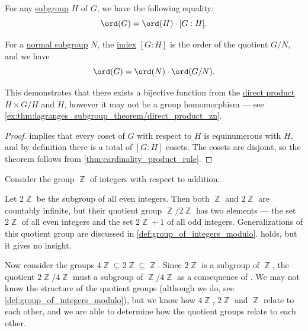 \begin{theorem}\label{thm:lagranges_subgroup_theorem}
  For any \hyperref[def:group/subobject]{subgroup} \( H \) of \( G \), we have the following equality:
  \begin{equation}\label{eq:thm:lagranges_subgroup_theorem/general}
    \ord(G) = \ord(H) \cdot [G : H].
  \end{equation}

  For a \hyperref[def:normal_subgroup]{normal subgroup} \( N \), the \hyperref[def:subgroup_index]{index} \( [G : H] \) is the order of the quotient \( G / N \), and we have
  \begin{equation}\label{eq:thm:lagranges_subgroup_theorem/normal}
    \ord(G) = \ord(N) \cdot \ord(G / N).
  \end{equation}
\end{theorem}
\begin{comments}
  \item This demonstrates that there exists a bijective function from the \hyperref[def:fol_direct_product]{direct product} \( H \times G / H \) and \( H \), however it may not be a group homomorphism --- see \cref{ex:thm:lagranges_subgroup_theorem/direct_product_zn}.
\end{comments}
\begin{proof}
   implies that every coset of \( G \) with respect to \( H \) is equinumerous with \( H \), and by definition there is a total of \( [G : H] \) cosets. The cosets are disjoint, so the theorem follows from \cref{thm:cardinality_product_rule}.
\end{proof}

\begin{example}\label{ex:subgroups_of_integers}
  Consider the group \( \BbbZ \) of integers with respect to addition.

  Let \( 2\BbbZ \) be the subgroup of all even integers. Then both \( \BbbZ \) and \( 2\BbbZ \) are countably infinite, but their quotient group \( \BbbZ / 2\BbbZ \) has two elements --- the set \( 2\BbbZ \) of all even integers and the set \( 2\BbbZ + 1 \) of all odd integers. Generalizations of this quotient group are discussed in \cref{def:group_of_integers_modulo}.  holds, but it gives no insight.

  Now consider the groups \( 4\BbbZ \subseteq 2\BbbZ \subseteq \BbbZ \). Since \( 2\BbbZ \) is a subgroup of \( \BbbZ \), the quotient \( 2\BbbZ / 4\BbbZ \) must a subgroup of \( \BbbZ / 4\BbbZ \) as a consequence of . We may not know the structure of the quotient groups (although we do, see \cref{def:group_of_integers_modulo}), but we know how \( 4\BbbZ \), \( 2\BbbZ \) and \( \BbbZ \) relate to each other, and we are able to determine how the quotient groups relate to each other.
\end{example}

